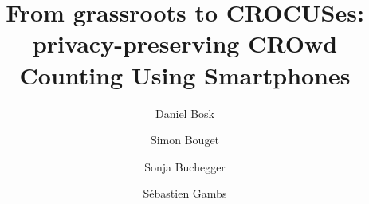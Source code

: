 \documentclass[USenglish]{article}
\begin{document}
\author[1]{Daniel Bosk}                                                            
\author[1]{Simon Bouget}
\author[1]{Sonja Buchegger}
\author[2]{S\'ebastien Gambs}

\title{%
  From grassroots to CROCUSes: privacy-preserving CROwd Counting Using 
  Smartphones 
}


\end{document}
